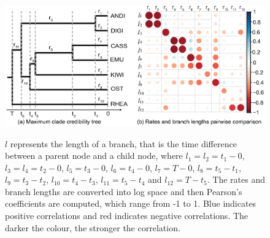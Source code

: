 \documentclass{bmcart}
\begin{document}
\begin{backmatter}
\begin{figure}[h!]
\includegraphics[width=12cm]{Fig11-correlation.eps}\\
\caption{
             $l$ represents the length of a branch, that is the time difference between a parent node and a child node, where ${l_1} = {l_2} =  {t_1} - 0$, ${l_3} = {l_4} = {t_2} - 0$, ${l_5} = {t_3} - 0$, ${l_6} = {t_4} - 0$, ${l_7} = T - 0$, ${l_8} = {t_5} - {t_1}$, ${l_9} = {t_3} - {t_2}$, ${l_{10}} = {t_4} - {t_3}$, ${l_{11}} = {t_5} - {t_4}$ and ${l_{12}} = T - {t_5}$. The rates and branch lengths are converted into log space and then Pearson's coefficients are computed, which range from -1 to 1. Blue indicates positive correlations and red indicates negative correlations. The darker the colour, the stronger the correlation. }
\label{correlation}
\end{figure}


\end{backmatter}
\end{document}
